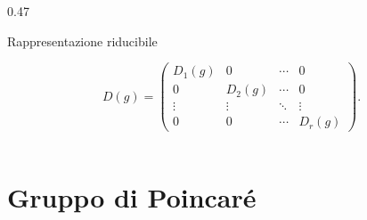 \documentclass[11pt,t,aspectratio=169]{beamer}
\begin{document}
\begin{frame}[c]
\begin{columns}[T,onlytextwidth]
\begin{column}{0.47\textwidth}
\begin{exampleblock}{Rappresentazione riducibile}
\begin{minipage}[t][0.70\textheight][t]{\linewidth}
                    \[
                        D(g)=
                        \begin{pmatrix}
                            D_1(g) & 0      & \cdots & 0 \\
                            0      & D_2(g) & \cdots & 0 \\
                            \vdots & \vdots & \ddots & \vdots \\
                            0      & 0      & \cdots & D_r(g)
                        \end{pmatrix}.
                    \]

                \end{minipage}

            \end{exampleblock}

        \end{column}

    \end{columns}

\end{frame}

\section{Gruppo di Poincaré}
\end{document}
